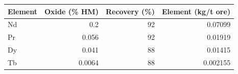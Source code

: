 \begin{tabular}{lrrr}\toprule
Element & Oxide (\% HM) & Recovery (\%) & Element (kg/t ore) \\\midrule
Nd & 0.2 & 92 & 0.07099 \\
Pr & 0.056 & 92 & 0.01919 \\
Dy & 0.041 & 88 & 0.01415 \\
Tb & 0.0064 & 88 & 0.002155 \\
\bottomrule\end{tabular}
